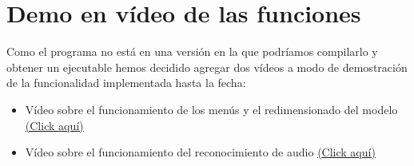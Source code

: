 \section{Demo en vídeo de las funciones}

Como el programa no está en una versión en la que podríamos compilarlo y obtener
un ejecutable hemos decidido agregar dos vídeos a modo de demostración de la funcionalidad
implementada hasta la fecha:
\begin{itemize}
	\item Vídeo sobre el funcionamiento de los menús y el redimensionado del modelo
	\href{https://youtu.be/k3u_HT00Kfg}{\underline{(Click aquí)}}
	\item Vídeo sobre el funcionamiento del reconocimiento de audio
	\href{https://youtu.be/k3u_HT00Kfg}{\underline{(Click aquí)}}
\end{itemize}
